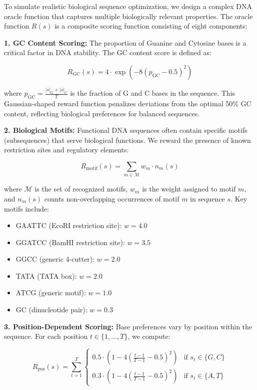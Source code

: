 \documentclass[conference]{IEEEtran}
\begin{document}
To simulate realistic biological sequence optimization, we design a complex DNA oracle function that captures multiple biologically relevant properties. The oracle function $R(s)$ is a composite scoring function consisting of eight components:

\textbf{1. GC Content Scoring:} The proportion of Guanine and Cytosine bases is a critical factor in DNA stability. The GC content score is defined as:

\begin{equation}
R_{\text{GC}}(s) = 4 \cdot \exp\left(-8(p_{\text{GC}} - 0.5)^2\right)
\end{equation}

where $p_{\text{GC}} = \frac{|s|_G + |s|_C}{T}$ is the fraction of G and C bases in the sequence. This Gaussian-shaped reward function penalizes deviations from the optimal 50\% GC content, reflecting biological preferences for balanced sequences.

\textbf{2. Biological Motifs:} Functional DNA sequences often contain specific motifs (subsequences) that serve biological functions. We reward the presence of known restriction sites and regulatory elements:

\begin{equation}
R_{\text{motif}}(s) = \sum_{m \in \mathcal{M}} w_m \cdot n_m(s)
\end{equation}

where $\mathcal{M}$ is the set of recognized motifs, $w_m$ is the weight assigned to motif $m$, and $n_m(s)$ counts non-overlapping occurrences of motif $m$ in sequence $s$. Key motifs include:
\begin{itemize}
    \item GAATTC (EcoRI restriction site): $w = 4.0$
    \item GGATCC (BamHI restriction site): $w = 3.5$
    \item GGCC (generic 4-cutter): $w = 2.0$
    \item TATA (TATA box): $w = 2.0$
    \item ATCG (generic motif): $w = 1.0$
    \item GC (dinucleotide pair): $w = 0.3$
\end{itemize}

\textbf{3. Position-Dependent Scoring:} Base preferences vary by position within the sequence. For each position $t \in \{1, \ldots, T\}$, we compute:

\begin{equation}
R_{\text{pos}}(s) = \sum_{t=1}^{T} \begin{cases}
0.5 \cdot \left(1 - 4\left(\frac{t-1}{T-1} - 0.5\right)^2\right) & \text{if } s_t \in \{G, C\} \\
0.3 \cdot \left(1 - 4\left(\frac{t-1}{T-1} - 0.5\right)^2\right) & \text{if } s_t \in \{A, T\}
\end{cases}
\end{equation}
\end{document}
